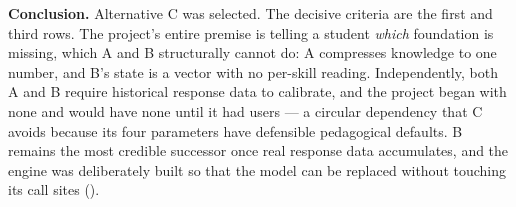 \noindent\textbf{Conclusion.} Alternative C was selected. The decisive criteria
are the first and third rows. The project's entire premise is telling a student
\emph{which} foundation is missing, which A and B structurally cannot do: A
compresses knowledge to one number, and B's state is a vector with no per-skill
reading. Independently, both A and B require historical response data to
calibrate, and the project began with none and would have none until it had
users --- a circular dependency that C avoids because its four parameters have
defensible pedagogical defaults. B remains the most credible successor once
real response data accumulates, and the engine was deliberately built so that
the model can be replaced without touching its call sites
().
